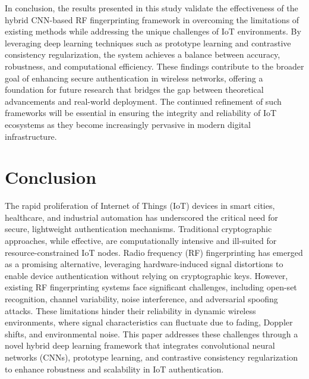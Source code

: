 \documentclass[conference]{IEEEtran}
\begin{document}
In conclusion, the results presented in this study validate the effectiveness of the hybrid CNN-based RF fingerprinting framework in overcoming the limitations of existing methods while addressing the unique challenges of IoT environments. By leveraging deep learning techniques such as prototype learning and contrastive consistency regularization, the system achieves a balance between accuracy, robustness, and computational efficiency. These findings contribute to the broader goal of enhancing secure authentication in wireless networks, offering a foundation for future research that bridges the gap between theoretical advancements and real-world deployment. The continued refinement of such frameworks will be essential in ensuring the integrity and reliability of IoT ecosystems as they become increasingly pervasive in modern digital infrastructure.

\section{Conclusion}

The rapid proliferation of Internet of Things (IoT) devices in smart cities, healthcare, and industrial automation has underscored the critical need for secure, lightweight authentication mechanisms. Traditional cryptographic approaches, while effective, are computationally intensive and ill-suited for resource-constrained IoT nodes. Radio frequency (RF) fingerprinting has emerged as a promising alternative, leveraging hardware-induced signal distortions to enable device authentication without relying on cryptographic keys. However, existing RF fingerprinting systems face significant challenges, including open-set recognition, channel variability, noise interference, and adversarial spoofing attacks. These limitations hinder their reliability in dynamic wireless environments, where signal characteristics can fluctuate due to fading, Doppler shifts, and environmental noise. This paper addresses these challenges through a novel hybrid deep learning framework that integrates convolutional neural networks (CNNs), prototype learning, and contrastive consistency regularization to enhance robustness and scalability in IoT authentication.  
\end{document}
